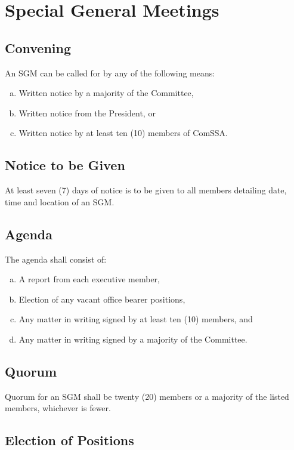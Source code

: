 \documentclass[a4paper,12pt]{article}
\begin{document}
\section{Special General Meetings}

\subsection{Convening}

An SGM can be called for by any of the following means:

\begin{enumerate}[a)]
	\item Written notice by a majority of the Committee,
	\item Written notice from the President, or
	\item Written notice by at least ten (10) members of ComSSA.
\end{enumerate}

\subsection{Notice to be Given}

At least seven (7) days of notice is to be given to all members detailing date, time and location of an SGM.

\subsection{Agenda}

The agenda shall consist of:

\begin{enumerate}[a)]
	\item A report from each executive member,
	\item Election of any vacant office bearer positions,
	\item Any matter in writing signed by at least ten (10) members, and
	\item Any matter in writing signed by a majority of the Committee.
\end{enumerate}

\subsection{Quorum}

Quorum for an SGM shall be twenty (20) members or a majority of the listed members, whichever is fewer.

\subsection{Election of Positions}
\end{document}
